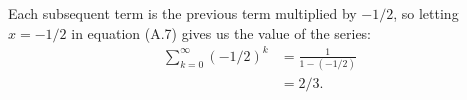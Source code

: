 Each subsequent term is the previous term multiplied by $-1/2$, so letting $x=-1/2$ in equation (A.7) gives us the value of the series:
\begin{align*}
    \sum_{k=0}^\infty(-1/2)^k &= \frac{1}{1-(-1/2)} \\
    &= 2/3.
\end{align*}
